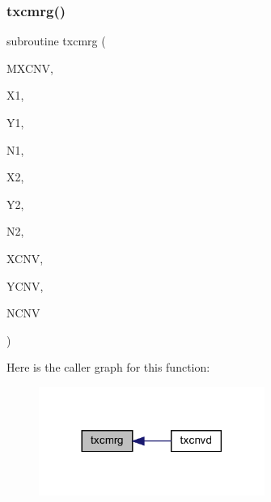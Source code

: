 \subsubsection{\texorpdfstring{txcmrg()}{txcmrg()}}
{\footnotesize\ttfamily subroutine txcmrg (\begin{DoxyParamCaption}\item[{integer, intent(in)}]{M\+X\+C\+NV,  }\item[{real, dimension(mxcnv), intent(in)}]{X1,  }\item[{real, dimension(mxcnv), intent(in)}]{Y1,  }\item[{integer, intent(in)}]{N1,  }\item[{real, dimension(mxcnv), intent(in)}]{X2,  }\item[{real, dimension(mxcnv), intent(in)}]{Y2,  }\item[{integer, intent(in)}]{N2,  }\item[{real, dimension(mxcnv), intent(out)}]{X\+C\+NV,  }\item[{real, dimension(4,mxcnv), intent(out)}]{Y\+C\+NV,  }\item[{integer, intent(out)}]{N\+C\+NV }\end{DoxyParamCaption})}

Here is the caller graph for this function\+:
\nopagebreak
\begin{figure}[H]
\begin{center}
\leavevmode
\includegraphics[width=209pt]{Marco_8f90_a91b093a6d74ab88b54c4e2121d31ffa2_icgraph}
\end{center}
\end{figure}
\mbox{\label{Marco_8f90_a1cdfcb6ee629073412c28d9cf0215636}} 
